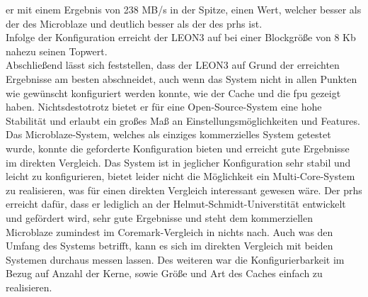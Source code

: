 er mit einem Ergebnis von 238 MB/s in der Spitze, einen Wert, welcher besser als der des Microblaze und deutlich besser als der des \ac{prhs} ist.\\ Infolge der
Konfiguration erreicht der LEON3 auf bei einer Blockgröße von 8 Kb nahezu seinen Topwert.\\
Abschließend lässt sich feststellen, dass der LEON3 auf Grund der erreichten Ergebnisse am besten abschneidet, auch wenn das System nicht in allen Punkten
wie gewünscht konfiguriert werden konnte, wie der Cache und die \ac{fpu} gezeigt haben. Nichtsdestotrotz bietet er für eine Open-Source-System eine hohe Stabilität
und erlaubt ein großes Maß an Einstellungsmöglichkeiten und Features. Das Microblaze-System, welches als einziges kommerzielles System getestet wurde, konnte die geforderte
Konfiguration bieten und erreicht gute Ergebnisse im direkten Vergleich. Das System ist in jeglicher Konfiguration sehr stabil und leicht zu konfigurieren, bietet
leider nicht die Möglichkeit ein Multi-Core-System zu realisieren, was für einen direkten Vergleich interessant gewesen wäre. Der \ac{prhs} erreicht dafür, dass er
lediglich an der Helmut-Schmidt-Universtität entwickelt und gefördert wird, sehr gute Ergebnisse und steht dem kommerziellen Microblaze zumindest im Coremark-Vergleich
in nichts nach. Auch was den Umfang des Systems betrifft, kann es sich im direkten Vergleich mit beiden Systemen durchaus messen lassen. Des weiteren war die
Konfigurierbarkeit im Bezug auf Anzahl der Kerne, sowie Größe und Art des Caches einfach zu realisieren.\\
